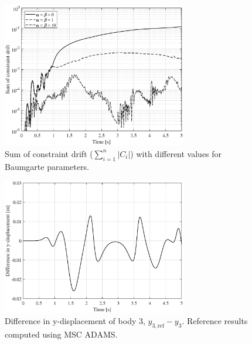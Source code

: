 \documentclass{article}
\begin{document}
\begin{figure}[h!]
	\centering
	\includegraphics[width=0.72\textwidth]{constraintdrift.eps}
	\caption{Sum of constraint drift ($\sum_{i=1}^{n} |C_i| $) with different values for Baumgarte parameters.\label{fig:constraintdrift}}
\end{figure}

\begin{figure}[h!]
	\centering
	\includegraphics[width=0.72\textwidth]{comparison.eps}
	\caption{Difference in y-displacement of body 3, $y_{3,\text{ref}}-y_3$. Reference results computed using MSC ADAMS.\label{fig:comparison}}
\end{figure}
\end{document}

